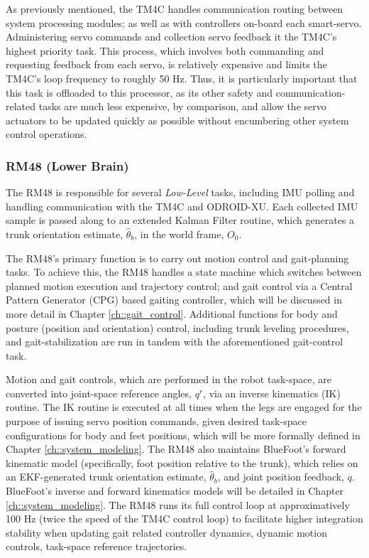 			As previously mentioned, the TM4C handles communication routing between system processing modules; as well as with controllers on-board each smart-servo. Administering servo commands and collection servo feedback it the TM4C's highest priority task. This process, which involves both commanding and requesting feedback from each servo, is relatively expensive  and limits the TM4C's loop frequency to roughly 50 Hz. Thus, it is particularly important that this task is offloaded to this processor, as its other safety and communication-related tasks are much less expensive, by comparison, and allow the servo actuators to be updated quickly as possible without encumbering other system control operations.


		\subsubsection{RM48 (Lower Brain)}

			The RM48 is responsible for several \emph{Low-Level} tasks, including IMU polling and handling communication with the TM4C and ODROID-XU. Each collected IMU sample is passed along to an extended Kalman Filter routine, which generates a trunk orientation estimate, $\hat{\theta}_{b}$, in the world frame, $O_{0}$. 

			The RM48's primary function is to carry out motion control and gait-planning tasks. To achieve this, the RM48 handles a state machine which switches between planned motion execution and trajectory control; and gait control via a Central Pattern Generator (CPG) based gaiting controller, which will be discussed in more detail in Chapter \ref{ch::gait_control}. Additional functions for body and posture (position and orientation) control, including trunk leveling procedures, and gait-stabilization are run in tandem with the aforementioned gait-control task.

			Motion and gait controls, which are performed in the robot task-space, are converted into joint-space reference angles, $q^{r}$, via an inverse kinematics (IK) routine. The IK routine is executed at all times when the legs are engaged for the purpose of issuing servo position commands, given desired task-space configurations for body and feet positions, which will be more formally defined in Chapter \ref{ch::system_modeling}. The RM48 also maintains BlueFoot's forward kinematic model (specifically, foot position relative to the trunk), which relies on an EKF-generated trunk orientation estimate, $\hat{\theta}_{b}$, and joint position feedback, $q$. BlueFoot's inverse and forward kinematics models will be detailed in Chapter \ref{ch::system_modeling}. The RM48 runs its full control loop at approximatively 100 Hz (twice the speed of the TM4C control loop) to facilitate higher integration stability when updating gait related controller dynamics, dynamic motion controls, task-space reference trajectories.

